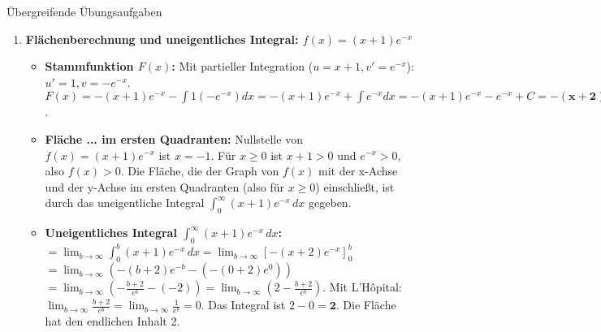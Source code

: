 \begin{loesungsumgebung}{Übergreifende Übungsaufgaben}
\begin{enumerate}
    \item \textbf{Flächenberechnung und uneigentliches Integral: $f(x) = (x+1)e^{-x}$}
    \begin{itemize}
        \item \textbf{Stammfunktion $F(x)$:} Mit partieller Integration ($u=x+1, v'=e^{-x}$):
        $u'=1, v=-e^{-x}$.
        $F(x) = -(x+1)e^{-x} - \int 1(-e^{-x})dx = -(x+1)e^{-x} + \int e^{-x}dx = -(x+1)e^{-x} - e^{-x} + C = \mathbf{-(x+2)e^{-x} + C}$.
        \item \textbf{Fläche ... im ersten Quadranten:} Nullstelle von $f(x)=(x+1)e^{-x}$ ist $x=-1$. Für $x \ge 0$ ist $x+1 > 0$ und $e^{-x} > 0$, also $f(x)>0$.
        Die Fläche, die der Graph von $f(x)$ mit der x-Achse und der y-Achse im ersten Quadranten (also für $x \ge 0$) einschließt, ist durch das uneigentliche Integral $\int_0^\infty (x+1)e^{-x} \,dx$ gegeben.
        \item \textbf{Uneigentliches Integral $\int_0^\infty (x+1)e^{-x} \,dx$:}
        $= \lim_{b \to \infty} \int_0^b (x+1)e^{-x} \,dx = \lim_{b \to \infty} [-(x+2)e^{-x}]_0^b$
        $= \lim_{b \to \infty} (-(b+2)e^{-b} - (-(0+2)e^0))$
        $= \lim_{b \to \infty} (-\frac{b+2}{e^b} - (-2)) = \lim_{b \to \infty} (2 - \frac{b+2}{e^b})$.
        Mit L'Hôpital: $\lim_{b \to \infty} \frac{b+2}{e^b} = \lim_{b \to \infty} \frac{1}{e^b} = 0$.
        Das Integral ist $2-0 = \mathbf{2}$. Die Fläche hat den endlichen Inhalt 2.
    \end{itemize}


\end{enumerate}
\end{loesungsumgebung}
